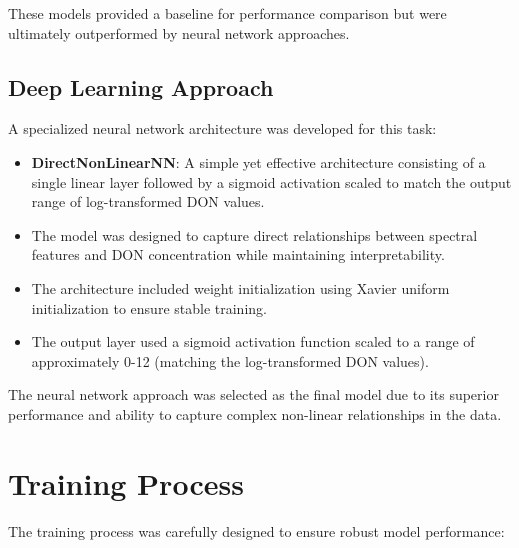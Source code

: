 \documentclass{article}
\begin{document}
These models provided a baseline for performance comparison but were ultimately outperformed by neural network approaches.

\subsection{Deep Learning Approach}
A specialized neural network architecture was developed for this task:

\begin{itemize}
    \item \textbf{DirectNonLinearNN}: A simple yet effective architecture consisting of a single linear layer followed by a sigmoid activation scaled to match the output range of log-transformed DON values.
    
    \item The model was designed to capture direct relationships between spectral features and DON concentration while maintaining interpretability.
    
    \item The architecture included weight initialization using Xavier uniform initialization to ensure stable training.
    
    \item The output layer used a sigmoid activation function scaled to a range of approximately 0-12 (matching the log-transformed DON values).
\end{itemize}

The neural network approach was selected as the final model due to its superior performance and ability to capture complex non-linear relationships in the data.

\section{Training Process}
The training process was carefully designed to ensure robust model performance:
\end{document}
